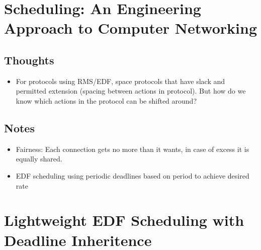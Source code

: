 \documentclass{article}
\begin{document}
\section{Scheduling: An Engineering Approach to Computer Networking}

\subsection{Thoughts}
\begin{itemize}
	\item For protocols using RMS/EDF, space protocols that have slack and permitted extension (spacing between actions in protocol).  But how do we know which actions in the protocol can be shifted around?
\end{itemize}

\subsection{Notes}
\begin{itemize}
    \item Fairness: Each connection gets no more than it wants, in case of excess it is equally shared.
    \item EDF scheduling using periodic deadlines based on period to achieve desired rate
\end{itemize}

\section{Lightweight EDF Scheduling with Deadline Inheritence}
\end{document}

